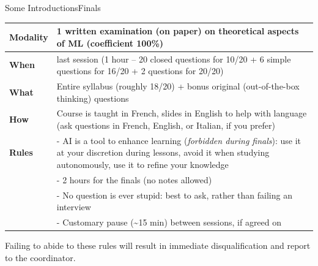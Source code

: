 \begin{frame}{Some Introductions}{Finals}
    \vfill
    \begin{tabular}{@{}lp{35em}@{}}
        \textbf{Modality} & 1 written examination (on paper) on theoretical aspects of ML (coefficient 100\%)                                                                                                   \\ \hline
        \textbf{When}     & last session (1 hour -- 20 closed questions for 10/20 + 6 simple questions for 16/20 + 2 questions for 20/20)                                                                       \\ \hline
        \textbf{What}     & Entire syllabus (roughly 18/20) + bonus original (out-of-the-box thinking) questions                                                                                                \\ \hline
        \textbf{How}      & Course is taught in French, slides in English to help with language (ask questions in French, English, or Italian, if you prefer)                                                   \\ \hline
        \textbf{Rules}    & - AI is a tool to enhance learning (\emph{forbidden during finals}): use it at your discretion during lessons, avoid it when studying autonomously, use it to refine your knowledge \\
                          & - 2 hours for the finals (no notes allowed)                                                                                                                                         \\
                          & - No question is ever stupid: best to ask, rather than failing an interview                                                                                                         \\
                          & - Customary pause (\textasciitilde 15 min) between sessions, if agreed on
    \end{tabular}
    \vfill

    \tiny Failing to abide to these rules will result in immediate disqualification and report to the coordinator.
    \strut
\end{frame}

